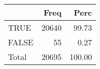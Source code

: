 
\begin{tabular}[t]{lrr}
\toprule
  & Freq & Perc\\
\midrule
TRUE & 20640 & 99.73\\
FALSE & 55 & 0.27\\
Total & 20695 & 100.00\\
\bottomrule
\end{tabular}